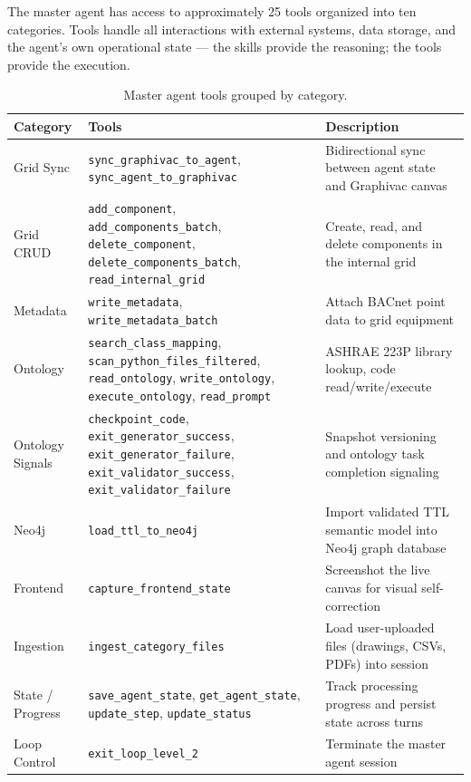 The master agent has access to approximately 25 tools organized into ten categories.
Tools handle all interactions with external systems, data storage, and the agent's own
operational state --- the skills provide the reasoning; the tools provide the execution.

\begin{table}[htbp]
  \caption{Master agent tools grouped by category.}
  \label{tab:tools}
  \centering
  \small
  \begin{tabular}{p{3.2cm}p{4.5cm}p{6.5cm}}
    \toprule
    \textbf{Category} & \textbf{Tools} & \textbf{Description} \\
    \midrule
    Grid Sync
      & \texttt{sync\_graphivac\_to\_agent},
        \texttt{sync\_agent\_to\_graphivac}
      & Bidirectional sync between agent state and Graphivac canvas \\
    \addlinespace
    Grid CRUD
      & \texttt{add\_component},
        \texttt{add\_components\_batch},
        \texttt{delete\_component},
        \texttt{delete\_components\_batch},
        \texttt{read\_internal\_grid}
      & Create, read, and delete components in the internal grid \\
    \addlinespace
    Metadata
      & \texttt{write\_metadata},
        \texttt{write\_metadata\_batch}
      & Attach BACnet point data to grid equipment \\
    \addlinespace
    Ontology
      & \texttt{search\_class\_mapping},
        \texttt{scan\_python\_files\_filtered},
        \texttt{read\_ontology},
        \texttt{write\_ontology},
        \texttt{execute\_ontology},
        \texttt{read\_prompt}
      & ASHRAE 223P library lookup, code read/write/execute \\
    \addlinespace
    Ontology Signals
      & \texttt{checkpoint\_code},
        \texttt{exit\_generator\_success},
        \texttt{exit\_generator\_failure},
        \texttt{exit\_validator\_success},
        \texttt{exit\_validator\_failure}
      & Snapshot versioning and ontology task completion signaling \\
    \addlinespace
    Neo4j
      & \texttt{load\_ttl\_to\_neo4j}
      & Import validated TTL semantic model into Neo4j graph database \\
    \addlinespace
    Frontend
      & \texttt{capture\_frontend\_state}
      & Screenshot the live canvas for visual self-correction \\
    \addlinespace
    Ingestion
      & \texttt{ingest\_category\_files}
      & Load user-uploaded files (drawings, CSVs, PDFs) into session \\
    \addlinespace
    State / Progress
      & \texttt{save\_agent\_state},
        \texttt{get\_agent\_state},
        \texttt{update\_step},
        \texttt{update\_status}
      & Track processing progress and persist state across turns \\
    \addlinespace
    Loop Control
      & \texttt{exit\_loop\_level\_2}
      & Terminate the master agent session \\
    \bottomrule
  \end{tabular}
\end{table}

